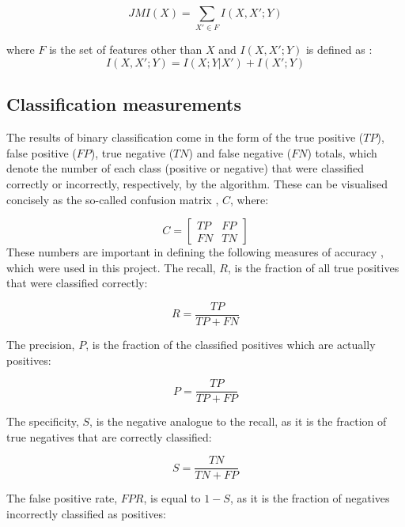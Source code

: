 \documentclass[12pt]{article}
\begin{document}
\begin{equation}
JMI(X)= \sum_{X' \in F} I(X,X';Y)
\end{equation}

where $F$ is the set of features other than $X$ \cite{lyon2016fifty} and $I(X,X';Y)$ is defined as \cite{bennasar2015feature}:
\begin{equation}
I(X,X';Y) = I(X;Y|X')+I(X';Y)
\end{equation}

\subsection{Classification measurements}

The results of binary classification come in the form of the true positive ($TP$), false positive ($FP$), true negative ($TN$) and false negative ($FN$) totals, which denote the number of each class (positive or negative) that were classified correctly or incorrectly, respectively, by the algorithm. These can be visualised concisely as the so-called confusion matrix \cite{kubat1998machine}, $C$, where:

\[
C =
  \begin{bmatrix}
    TP & FP \\
    FN & TN
  \end{bmatrix}
\]
These numbers are important in defining the following measures of accuracy \cite{lyon2016fifty}, which were used in this project. The recall, $R$, is the fraction of all true positives that were classified correctly:

\begin{equation}
R = \frac{TP}{TP + FN}
\label{recall}
\end{equation}

The precision, $P$, is the fraction of the classified positives which are actually positives:

\begin{equation}
P = \frac{TP}{TP + FP}
\label{prec}
\end{equation}

The specificity, $S$, is the negative analogue to the recall, as it is the fraction of true negatives that are correctly classified:

\begin{equation}
S = \frac{TN}{TN + FP}
\label{spec}
\end{equation}

The false positive rate, $FPR$, is equal to $1 - S$, as it is the fraction of negatives incorrectly classified as positives:
\end{document}
